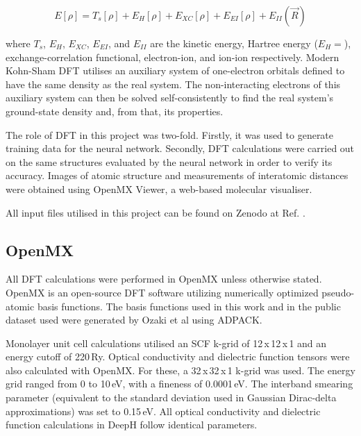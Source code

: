 \documentclass[11pt,a4paper,twoside]{report}  %
\numberwithin{equation}{section}					%
\numberwithin{figure}{section}						%
\begin{document}
\begin{equation}E[\rho] = T_s[\rho]+E_H[\rho]+E_{XC}[\rho]+E_{EI}[\rho]+E_{II}(\vec R)\label{equation:DFT}\end{equation}

where $T_s$, $E_H$, $E_{XC}$, $E_{EI}$, and $E_{II}$ are the kinetic energy, Hartree energy ($E_H = $), exchange-correlation functional, electron-ion, and ion-ion respectively. Modern Kohn-Sham DFT utilises an auxiliary system of one-electron orbitals defined to have the same density as the real system\autocite{kohnSelfConsistentEquationsIncluding1965}. The non-interacting electrons of this auxiliary system can then be solved self-consistently to find the real system's ground-state density and, from that, its properties. 

The role of DFT in this project was two-fold. Firstly, it was used to generate training data for the neural network. Secondly, DFT calculations were carried out on the same structures evaluated by the neural network in order to verify its accuracy. Images of atomic structure and measurements of interatomic distances were obtained using OpenMX Viewer, a web-based molecular visualiser\autocite{leeOpenMXViewerWebbased2019}. 

All input files utilised in this project can be found on Zenodo at Ref. \cite{}.


\subsection{OpenMX\autocites{ozakiEfficientProjectorExpansion2005,ozakiNumericalAtomicBasis2004, ozakiVariationallyOptimizedAtomic2003, lejaeghereReproducibilityDensityFunctional2016}}

All DFT calculations were performed in OpenMX unless otherwise stated. OpenMX is an open-source DFT software utilizing numerically optimized pseudo-atomic basis functions. The basis functions used in this work and in the public dataset used were generated by Ozaki et al using ADPACK\autocites{ozakiVariationallyOptimizedAtomic2003,ozakiNumericalAtomicBasis2004}.

Monolayer unit cell calculations utilised an SCF k-grid of 12\,x\,12\,x\,1 and an energy cutoff of 220\,Ry. Optical conductivity and dielectric function tensors were also calculated with OpenMX. For these, a 32\,x\,32\,x\,1 k-grid was used. The energy grid ranged from 0 to 10\,eV, with a fineness of 0.0001\,eV. The interband smearing parameter (equivalent to the standard deviation used in Gaussian Dirac-delta approximations) was set to 0.15\,eV. All optical conductivity and dielectric function calculations in DeepH follow identical parameters. 
\end{document}
